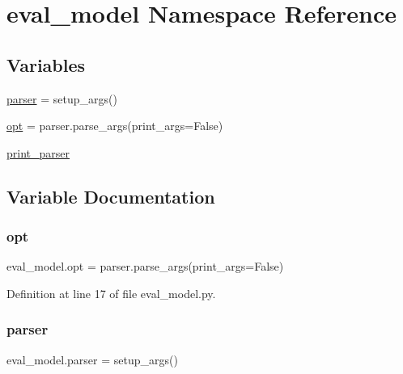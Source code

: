 \hypertarget{namespaceeval__model}{}\section{eval\+\_\+model Namespace Reference}
\label{namespaceeval__model}
\subsection*{Variables}
\begin{DoxyCompactItemize}
\item 
\hyperlink{namespaceeval__model_af40266de0e7152af5dc5a835a47a16a0}{parser} = setup\+\_\+args()
\item 
\hyperlink{namespaceeval__model_a748426649b07d37488ff05ef80081f2c}{opt} = parser.\+parse\+\_\+args(print\+\_\+args=False)
\item 
\hyperlink{namespaceeval__model_a09dddb88f4842a88e26a0961b1c8a5e3}{print\+\_\+parser}
\end{DoxyCompactItemize}


\subsection{Variable Documentation}
\mbox{\label{namespaceeval__model_a748426649b07d37488ff05ef80081f2c}} 
\subsubsection{\texorpdfstring{opt}{opt}}
{\footnotesize\ttfamily eval\+\_\+model.\+opt = parser.\+parse\+\_\+args(print\+\_\+args=False)}



Definition at line 17 of file eval\+\_\+model.\+py.

\mbox{\label{namespaceeval__model_af40266de0e7152af5dc5a835a47a16a0}} 
\subsubsection{\texorpdfstring{parser}{parser}}
{\footnotesize\ttfamily eval\+\_\+model.\+parser = setup\+\_\+args()}



